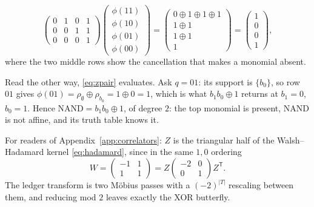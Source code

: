 \documentclass[11pt]{article}
\begin{document}
\begin{example}
\begin{equation*}
\begin{pmatrix}
    0 & 1 & 0 & 1 \\
    0 & 0 & 1 & 1 \\
    0 & 0 & 0 & 1
  \end{pmatrix}
  \begin{pmatrix}
    \phi(11) \\ \phi(10) \\ \phi(01) \\ \phi(00)
  \end{pmatrix}
  =
  \begin{pmatrix}
    0 \oplus 1 \oplus 1 \oplus 1 \\ 1 \oplus 1 \\ 1 \oplus 1 \\ 1
  \end{pmatrix}
  =
  \begin{pmatrix}
    1 \\ 0 \\ 0 \\ 1
  \end{pmatrix} ,
\end{equation*}
%
where the two middle rows show the cancellation that makes a monomial
absent.

Read the other way, \eqref{eq:zpair} evaluates. Ask $q = 01$: its
support is $\{b_0\}$, so row $01$ gives
$\phi(01) = \rho_\emptyset \oplus \rho_{b_0} = 1 \oplus 0 = 1$, which
is what $b_1 b_0 \oplus 1$ returns at $b_1 = 0$, $b_0 = 1$. Hence
$\mathrm{NAND} = b_1 b_0 \oplus 1$, of degree $2$: the top monomial is
present, NAND is not affine, and its truth table knows it.
\end{example}

For readers of Appendix~\ref{app:correlators}: $Z$ is the triangular
half of the Walsh--Hadamard kernel \eqref{eq:hadamard}, since in the
same $1,0$ ordering
%
\begin{equation}
  W = \begin{pmatrix} -1 & 1 \\ 1 & 1 \end{pmatrix}
  = Z \begin{pmatrix} -2 & 0 \\ 0 & 1 \end{pmatrix} Z^{\mathsf T}.
  \label{eq:wfactor}
\end{equation}
%
The ledger transform is two M\"obius passes with
a $(-2)^{|T|}$ rescaling between them, and reducing mod $2$ leaves
exactly the XOR butterfly.
\end{document}
